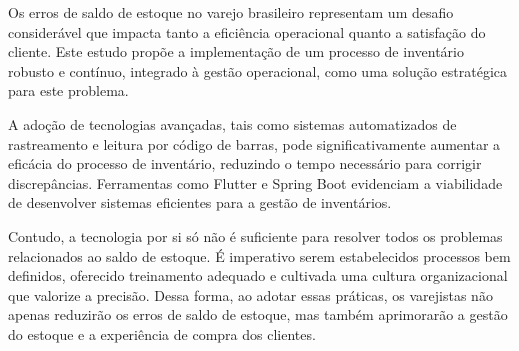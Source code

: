 
Os erros de saldo de estoque no varejo brasileiro representam um desafio considerável que impacta tanto a eficiência operacional quanto a satisfação do cliente. Este estudo propõe a implementação de um processo de inventário robusto e contínuo, integrado à gestão operacional, como uma solução estratégica para este problema.

A adoção de tecnologias avançadas, tais como sistemas automatizados de rastreamento e leitura por código de barras, pode significativamente aumentar a eficácia do processo de inventário, reduzindo o tempo necessário para corrigir discrepâncias. Ferramentas como Flutter e Spring Boot evidenciam a viabilidade de desenvolver sistemas eficientes para a gestão de inventários.

Contudo, a tecnologia por si só não é suficiente para resolver todos os problemas relacionados ao saldo de estoque. É imperativo serem estabelecidos processos bem definidos, oferecido treinamento adequado e cultivada uma cultura organizacional que valorize a precisão. Dessa forma, ao adotar essas práticas, os varejistas não apenas reduzirão os erros de saldo de estoque, mas também aprimorarão a gestão do estoque e a experiência de compra dos clientes.